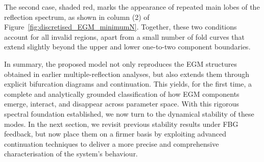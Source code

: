 The second case, shaded red, marks the appearance of repeated main lobes of the reflection spectrum, as shown in column (2) of Figure~\ref{fig:discretised_EGM_minimumN}. 
Together, these two conditions account for all invalid regions, apart from a small number of fold curves that extend slightly beyond the upper and lower one-to-two component boundaries.
%
\par
%
In summary, the proposed model not only reproduces the EGM structures obtained in earlier multiple-reflection analyses, but also extends them through explicit bifurcation diagrams and continuation. 
This yields, for the first time, a complete and analytically grounded classification of how EGM components emerge, interact, and disappear across parameter space. 
With this rigorous spectral foundation established, we now turn to the dynamical stability of these modes. 
In the next section, we revisit previous stability results under FBG feedback, but now place them on a firmer basis by exploiting advanced continuation techniques to deliver a more precise and comprehensive characterisation of the system’s behaviour.
%
%
